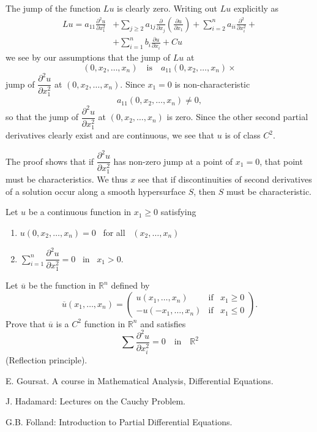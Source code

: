 The jump of the function $Lu$ is clearly zero. Writing out $Lu$ explicitly as
\begin{align*}
Lu = a_{11}\frac{\partial^{2}u}{\partial x^{2}_{1}} &+ \sum\limits_{j\geq 2}a_{1j}\frac{\partial}{\partial x_{j}}\left(\frac{\partial u}{\partial x_{1}}\right)+\sum\limits^{n}_{i=2}a_{ii}\frac{\partial^{2}}{\partial x^{2}_{i}}+\\[3pt]
&+ \sum\limits^{n}_{i=1}b_{i}\frac{\partial u}{\partial x_{i}}+Cu
\end{align*}
we see by our assumptions that the jump of $Lu$ at 
$$
(0,x_{2},\ldots,x_{n})\quad\text{is}\quad a_{11}(0,x_{2},\ldots,x_{n})\times
$$
jump of $\dfrac{\partial^{2}u}{\partial x^{2}_{1}}$ at $(0,x_{2},\ldots,x_{n})$. Since $x_{1}=0$ is non-characteristic 
$$
a_{11}(0,x_{2},\ldots,x_{n})\neq 0,
$$
so that the jump of $\dfrac{\partial^{2}u}{\partial x^{2}_{1}}$ at $(0,x_{2},\ldots,x_{n})$ is zero. Since the other second partial derivatives clearly exist and are continuous, we see that $u$ is of class $C^{2}$.

\begin{remark*}
The proof shows that if $\dfrac{\partial^{2}u}{\partial x^{2}_{1}}$ has non-zero jump at a point of $x_{1}=0$, that point must be characteristics. We thus $x$ see that if discontinuities of second derivatives of a solution occur along a smooth hypersurface $S$, then $S$ must be characteristic.
\end{remark*}

\begin{exer*}
Let $u$ be a continuous function in $x_{1}\geq 0$ satisfying
\begin{enumerate}
\renewcommand{\labelenumi}{(\theenumi)}
\item $u(0,x_{2},\ldots,x_{n})=0$ \ for all \ $(x_{2},\ldots,x_{n})$

\item $\sum\limits^{n}_{i=1}\dfrac{\partial^{2}u}{\partial x^{2}_{1}}=0$ \ in \ $x_{1}>0$.
\end{enumerate}
\end{exer*}

Let $\overline{u}$ be the function in $\mathbb{R}^{n}$ defined by
$$
\overline{u}(x_{1},\ldots,x_{n})=
\left(
\begin{array}{ccc}
u(x_{1},\ldots,x_{n}) & \text{if} & x_{1}\geq 0\\[3pt]
-u(-x_{1},\ldots,x_{n}) & \text{if} & x_{1}\leq 0
\end{array}
\right).
$$
Prove that $\overline{u}$ is a $C^{2}$ function in $\mathbb{R}^{n}$ and satisfies 
$$
\sum \frac{\partial^{2}u}{\partial x^{2}_{i}}=0\quad\text{in}\quad \mathbb{R}^{2}
$$
(Reflection principle).

\begin{thebibliography}{99}
 E. Goursat. A course in Mathematical Analysis, Differential Equations.

 J. Hadamard: Lectures on the Cauchy Problem.

 G.B. Folland: Introduction to Partial Differential Equations.
\end{thebibliography}
